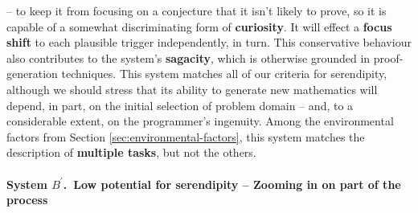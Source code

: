 \cite[p.~193]{colton2007computational} -- to keep it from focusing on
a conjecture that it isn't likely to prove, so it is capable of a
somewhat discriminating form of \textbf{curiosity}.  It will effect a
\textbf{focus shift} to each plausible trigger independently, in turn.
This conservative behaviour also contributes to the system's
\textbf{sagacity}, which is otherwise grounded in proof-generation
techniques.  This system matches all of our criteria for serendipity,
although we should stress that its ability to generate new mathematics
will depend, in part, on the initial selection of problem domain --
and, to a considerable extent, on the programmer's ingenuity.  Among
the environmental factors from Section
\ref{sec:environmental-factors}, this system matches the description
of \textbf{multiple tasks}, but not the others.

\paragraph{System $B^{\prime}$.~Low potential for serendipity -- Zooming in on part of the process}

